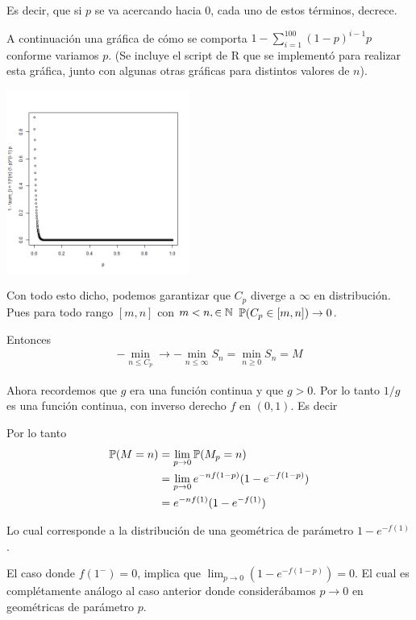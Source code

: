 Es decir, que si $p$ se va acercando hacia 0, cada uno de estos términos, decrece.\pn

A continuación una gráfica de cómo se comporta $1 - \sum_{i = 1}^{100} (1-p)^{i-1}p$ conforme variamos $p$.
(Se incluye el script de R que se implementó para realizar esta gráfica, junto con algunas otras gráficas para
distintos valores de $n$).\pn

\begin{center}
    \includegraphics[width=6cm]{tarea2/problema2_1/graficas_inciso2_1_4/probabilidadDeQueC_pSupere100.png}
\end{center}\pn

Con todo esto dicho, podemos garantizar que $C_p$ diverge a $\infty$ en distribución. Pues para todo rango $[m, n]$ con $m<n,\in \mathbb{N}$
$\mathbb{P}(C_p \in [m, n]) \rightarrow 0$. \pn

Entonces 
\begin{align}
    - \min_{n \leq C_p} \rightarrow - \min_{n \leq \infty} S_n = \min_{n \geq 0} S_n = M
\end{align}\pn

Ahora recordemos que $g$ era una función continua y que $g>0$. Por lo tanto $1/g$ es una función continua,
con inverso derecho $f$ en $(0, 1)$. Es decir

Por lo tanto
\begin{align}
    \mathbb{P}(M = n)  &=  \lim_{p \rightarrow 0} \mathbb{P}(M_p = n)                         \\
                &=  \lim_{p \rightarrow 0} e^{-n f(1-p)}(1-e^{- f(1-p)})        \\
                &=   e^{-n f(1)}(1-e^{- f(1)}) \label{problema2_1:distribucion_de_M}
\end{align}

Lo cual corresponde a la distribución de una geométrica de parámetro $1-e^{- f(1)}$.\pn

El caso donde $f(1^-) = 0$, implica que $\lim_{p\rightarrow0} (1-e^{- f(1-p)}) = 0$. El cual es complétamente
análogo al caso anterior donde considerábamos $p \rightarrow 0$ en geométricas de parámetro $p$.\pn

